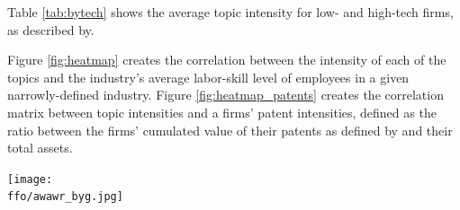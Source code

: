 \documentclass[12pt, letterpaper]{article}
\begin{document}
Table \ref{tab:bytech} shows the average topic intensity for low- and high-tech firms, as described by. 

 

Figure  \ref{fig:heatmap} creates the correlation between the intensity of each of the topics and the industry's  \cite{Belo2017-qi} average labor-skill level of employees in a given narrowly-defined industry. Figure \ref{fig:heatmap_patents} creates the correlation matrix between topic intensities and a firms' patent intensities, defined as the ratio between the firms' cumulated value of their patents as defined by \cite{Kogan2019-mw} and their total assets.







 
\FloatBarrier
\texttt{[image: \\ffo/awawr\_byg.jpg]}
\FloatBarrier




\end{document}
